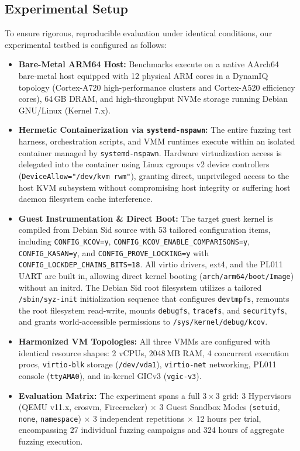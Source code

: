 \documentclass{article}
\begin{document}
\subsection{Experimental Setup}
To ensure rigorous, reproducible evaluation under identical conditions, our experimental testbed is configured as follows:
\begin{itemize}[leftmargin=*]
    \item \textbf{Bare-Metal ARM64 Host:} Benchmarks execute on a native AArch64 bare-metal host equipped with 12 physical ARM cores in a DynamIQ topology (Cortex-A720 high-performance clusters and Cortex-A520 efficiency cores), 64\,GB DRAM, and high-throughput NVMe storage running Debian GNU/Linux (Kernel 7.x).
    \item \textbf{Hermetic Containerization via \texttt{systemd-nspawn}:} The entire fuzzing test harness, orchestration scripts, and VMM runtimes execute within an isolated container managed by \texttt{systemd-nspawn}. Hardware virtualization access is delegated into the container using Linux cgroups v2 device controllers (\texttt{DeviceAllow="/dev/kvm rwm"}), granting direct, unprivileged access to the host KVM subsystem without compromising host integrity or suffering host daemon filesystem cache interference.
    \item \textbf{Guest Instrumentation \& Direct Boot:} The target guest kernel is compiled from Debian Sid source with 53 tailored configuration items, including \texttt{CONFIG\_KCOV=y}, \texttt{CONFIG\_KCOV\_ENABLE\_COMPARISONS=y}, \texttt{CONFIG\_KASAN=y}, and \texttt{CONFIG\_PROVE\_LOCKING=y} with \texttt{CONFIG\_LOCKDEP\_CHAINS\_BITS=18}. All virtio drivers, ext4, and the PL011 UART are built in, allowing direct kernel booting (\texttt{arch/arm64/boot/Image}) without an initrd. The Debian Sid root filesystem utilizes a tailored \texttt{/sbin/syz-init} initialization sequence that configures \texttt{devtmpfs}, remounts the root filesystem read-write, mounts \texttt{debugfs}, \texttt{tracefs}, and \texttt{securityfs}, and grants world-accessible permissions to \texttt{/sys/kernel/debug/kcov}.
    \item \textbf{Harmonized VM Topologies:} All three VMMs are configured with identical resource shapes: 2 vCPUs, 2048\,MB RAM, 4 concurrent execution procs, \texttt{virtio-blk} storage (\texttt{/dev/vda1}), \texttt{virtio-net} networking, PL011 console (\texttt{ttyAMA0}), and in-kernel GICv3 (\texttt{vgic-v3}).
    \item \textbf{Evaluation Matrix:} The experiment spans a full $3 \times 3$ grid: 3 Hypervisors (QEMU v11.x, crosvm, Firecracker) $\times$ 3 Guest Sandbox Modes (\texttt{setuid}, \texttt{none}, \texttt{namespace}) $\times$ 3 independent repetitions $\times$ 12 hours per trial, encompassing 27 individual fuzzing campaigns and 324 hours of aggregate fuzzing execution.
\end{itemize}
\end{document}
